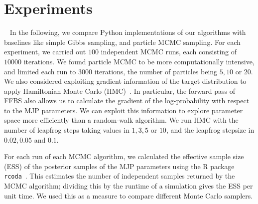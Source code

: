 
\section{Experiments}~
In the following, we compare Python implementations of our algorithms with baselines like simple Gibbs sampling, 
and particle MCMC sampling. For each experiment, we carried out $100$ independent MCMC runs, each consisting of $10000$ iterations.
We found particle MCMC to be more computationally intensive, and limited each run to $3000$ iterations, the number of particles being $5, 10$ or $20$. 
We also considered exploiting gradient information of the target distribution to apply Hamiltonian Monte Carlo (HMC)~\cite{Neal2010}. In particular, the forward pass of
FFBS also allows us to calculate the gradient of the log-probability with respect to the MJP parameters. We can exploit this information to explore parameter
space more efficiently than a random-walk algorithm. We run HMC with the number of leapfrog steps taking values in $1, 3, 5$ or $10$, and the leapfrog stepsize in 
$0.02, 0.05$ and $0.1$. 

For each run of each MCMC algorithm, we calculated the effective sample size (ESS) of the posterior samples of the MJP parameters using the R 
package \texttt{rcoda}~\cite{Rcoda2006}. This estimates the number of independent samples returned by the MCMC algorithm; dividing this by the runtime of a 
simulation gives the ESS per unit time. We used this as a measure to compare different Monte Carlo samplers.

